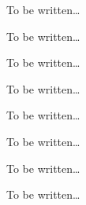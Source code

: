 \begin{command}{\pgfsys@animation@rotatealong{}}
  To be written\dots
\end{command}

\begin{command}{\pgfsys@animation@norotatealong{}}
  To be written\dots
\end{command}

\begin{command}{\pgfsys@animation@movealong{}}
  To be written\dots
\end{command}

\begin{command}{\pgfsys@animation@text{}}
  To be written\dots
\end{command}

\begin{command}{\pgfsys@animation@scalar{}}
  To be written\dots
\end{command}

\begin{command}{\pgfsys@animation@dimension{}}
  To be written\dots
\end{command}

\begin{command}{\pgfsys@animation@color@rgb{}}
  To be written\dots
\end{command}

\begin{command}{\pgfsys@animation@color@cmyk{}}
  To be written\dots
\end{command}

